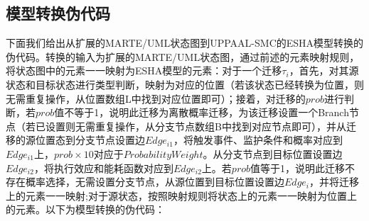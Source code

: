 \subsection{模型转换伪代码}
	下面我们给出从扩展的MARTE/UML状态图到UPPAAL-SMC的ESHA模型转换的伪代码。转换的输入为扩展的MARTE/UML状态图，通过前述的元素映射规则，将状态图中的元素一一映射为ESHA模型的元素：对于一个迁移$\tau_{i}$，首先，对其源状态和目标状态进行类型判断，映射为对应的位置（若该状态已经转换为位置，则无需重复操作，从位置数组L中找到对应位置即可）；接着，对迁移的$prob$进行判断，若$prob$值不等于1，说明此迁移为离散概率迁移，为该迁移设置一个Branch节点（若已设置则无需重复操作，从分支节点数组B中找到对应节点即可），并从迁移的源位置态到分支节点设置边$Edge_{i1}$，将触发事件、监护条件和概率对应到$Edge_{i1}$上，$prob \times 10$对应于$Probability Weight$。从分支节点到目标位置设置边$Edge_{i2}$，将执行效应和能耗函数对应到$Edge_{i2}$上。若$prob$值等于1，说明此迁移不存在概率选择，无需设置分支节点，从源位置到目标位置设置边$Edge_{i}$，并将迁移上的元素一一映射;对于源状态，按照映射规则将状态上的元素一一映射为位置上的元素。以下为模型转换的伪代码：
		
\renewcommand{\algorithmicrequire}{\textbf{输入:}}
\renewcommand{\algorithmicensure}{\textbf{输出:}}
	
